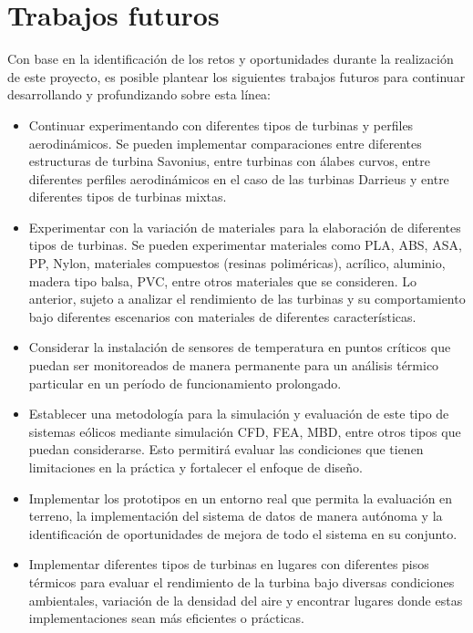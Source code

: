 \documentclass[letterpaper,12pt, oneside]{book}
\begin{document}
\section{Trabajos futuros}

Con base en la identificación de los retos y oportunidades durante la realización de este proyecto, es posible plantear los siguientes trabajos futuros para continuar desarrollando y profundizando sobre esta línea:

\begin{itemize}

\item Continuar experimentando con diferentes tipos de turbinas y perfiles aerodinámicos. Se pueden implementar comparaciones entre diferentes estructuras de turbina Savonius, entre turbinas con álabes curvos, entre diferentes perfiles aerodinámicos en el caso de las turbinas Darrieus y entre diferentes tipos de turbinas mixtas.

\item Experimentar con la variación de materiales para la elaboración de diferentes tipos de turbinas. Se pueden experimentar materiales como PLA, ABS, ASA, PP, Nylon, materiales compuestos (resinas poliméricas), acrílico, aluminio, madera tipo balsa, PVC, entre otros materiales que se consideren. Lo anterior, sujeto a analizar el rendimiento de las turbinas y su comportamiento bajo diferentes escenarios con materiales de diferentes características.

\item Considerar la instalación de sensores de temperatura en puntos críticos que puedan ser monitoreados de manera permanente para un análisis térmico particular en un período de funcionamiento prolongado.

\item Establecer una metodología para la simulación y evaluación de este tipo de sistemas eólicos mediante simulación CFD, FEA, MBD, entre otros tipos que puedan considerarse. Esto permitirá evaluar las condiciones que tienen limitaciones en la práctica y fortalecer el enfoque de diseño.

\item Implementar los prototipos en un entorno real que permita la evaluación en terreno, la implementación del sistema de datos de manera autónoma y la identificación de oportunidades de mejora de todo el sistema en su conjunto.

\item Implementar diferentes tipos de turbinas en lugares con diferentes pisos térmicos para evaluar el rendimiento de la turbina bajo diversas condiciones ambientales, variación de la densidad del aire y encontrar lugares donde estas implementaciones sean más eficientes o prácticas.


\end{itemize}
\end{document}
